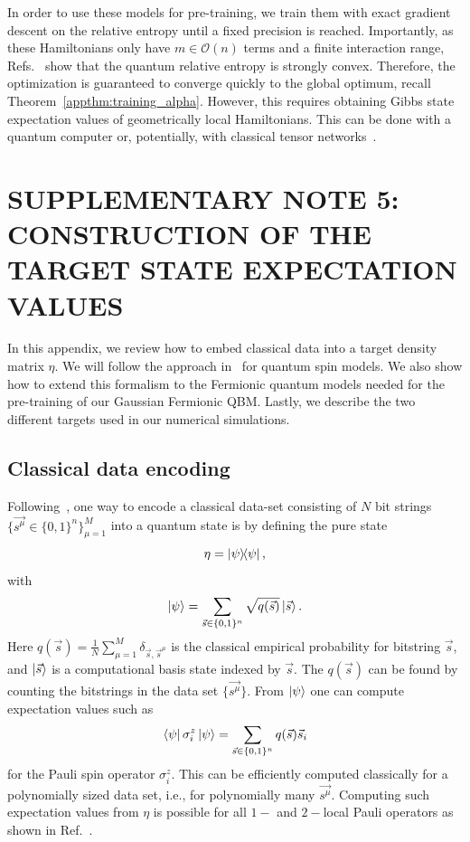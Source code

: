 \documentclass[
    reprint,
    aps,
    prx,
    longbibliography
]{revtex4-2}
\begin{document}
In order to use these models for pre-training, we train them with exact gradient descent on the relative entropy until a fixed precision is reached. Importantly, as these Hamiltonians only have $m \in \mathcal{O}(n)$ terms and a finite interaction range, Refs.~\cite{Anshu_2021, Haah_2024} show that the quantum relative entropy is strongly convex. Therefore, the optimization is guaranteed to converge quickly to the global optimum, recall Theorem~\ref{appthm:training_alpha}. However, this requires obtaining Gibbs state expectation values of geometrically local Hamiltonians. This can be done with a quantum computer or, potentially, with classical tensor networks~\cite{Kuwahara2021, Alhambra_2021}. 


\section*{\MakeUppercase{Supplementary Note 5: Construction of the target state expectation values}}

In this appendix, we review how to embed classical data into a target density matrix $\eta$. We will follow the approach in~\cite{Kappen_2020} for quantum spin models. We also show how to extend this formalism to the Fermionic quantum models needed for the pre-training of our Gaussian Fermionic QBM. Lastly, we describe the two different targets used in our numerical simulations.

\subsection*{Classical data encoding}

Following~\cite{Kappen_2020}, one way to encode a classical data-set consisting of $N$ bit strings $\{\vec{s^\mu}\in\{0,1\}^n\}_{\mu=1}^M$ into a quantum state is by defining the pure state 
\begin{equation}
    \eta = \dyad{\psi},
\end{equation} 
with
\begin{equation}
    \ket{\psi} = \sum_{\vec{s}\in\{0,1\}^n} \sqrt{q(\vec{s})}\ket{\vec{s}}. 
\end{equation} 
Here $q(\vec{s})=\frac{1}{N}\sum_{\mu=1}^M\delta_{\vec{s}, \vec{s}^\mu}$ is the classical empirical probability for bitstring $\vec{s}$, and $\ket{\vec{s}}$ is a computational basis state indexed by $\vec{s}$. The $q(\vec{s})$ can be found by counting the bitstrings in the data set $\{\vec{s^\mu}\}$. From $\ket{\psi}$ one can compute expectation values such as 
\begin{equation} 
    \bra{\psi}\sigma^z_i\ket{\psi} = \sum_{\vec{s}\in\{0,1\}^n}q(\vec{s})\vec{s}_i
\end{equation} 
for the Pauli spin operator $\sigma^z_i$. This can be efficiently computed classically for a polynomially sized data set, i.e., for polynomially many $\vec{s^\mu}$. Computing such expectation values from $\eta$ is possible for all $1-$ and $2-$local Pauli operators as shown in Ref.~\cite{Kappen_2020}. 
\end{document}
